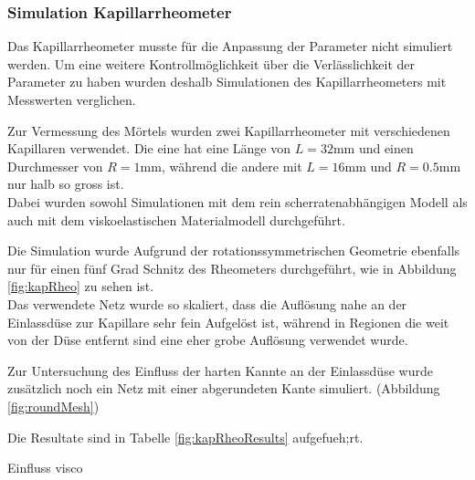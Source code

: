 \subsubsection{Simulation Kapillarrheometer}
Das Kapillarrheometer musste für die Anpassung der Parameter nicht simuliert werden. Um eine weitere Kontrollmöglichkeit über die Verlässlichkeit der Parameter zu haben wurden deshalb Simulationen des Kapillarrheometers mit Messwerten verglichen.

Zur Vermessung des Mörtels wurden zwei Kapillarrheometer mit verschiedenen Kapillaren verwendet. Die eine hat eine Länge von $L=32\mbox{mm}$ und einen Durchmesser von $R=1\mbox{mm}$, während die andere mit $L=16\mbox{mm}$ und $R=0.5\mbox{mm}$ nur halb so gross ist.\\
Dabei wurden sowohl Simulationen mit dem rein scherratenabhängigen Modell als auch mit dem viskoelastischen Materialmodell durchgeführt.

Die Simulation wurde Aufgrund der rotationssymmetrischen Geometrie ebenfalls nur für einen fünf Grad Schnitz  des Rheometers durchgeführt, wie in Abbildung \ref{fig:kapRheo}  zu sehen ist.\\
Das verwendete Netz wurde so skaliert, dass die Auflösung nahe an der Einlassdüse zur Kapillare sehr fein Aufgelöst ist, während in Regionen die weit von der Düse entfernt sind eine eher grobe Auflösung verwendet wurde.

Zur Untersuchung des Einfluss der harten Kannte an der Einlassdüse wurde zusätzlich noch ein Netz mit einer abgerundeten Kante simuliert. (Abbildung \ref{fig:roundMesh})  

Die Resultate sind in Tabelle \ref{fig:kapRheoResults} aufgefueh;rt.

\begin{todocontent}
    \1 Einfluss visco
\end{todocontent}
%
